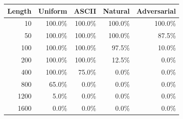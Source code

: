 \begin{tabular}{rrrrr}
\toprule
\textbf{Length} & \textbf{Uniform} & \textbf{ASCII} & \textbf{Natural} & \textbf{Adversarial} \\
\midrule
10 & 100.0\% & 100.0\% & 100.0\% & 100.0\% \\
50 & 100.0\% & 100.0\% & 100.0\% & 87.5\% \\
100 & 100.0\% & 100.0\% & 97.5\% & 10.0\% \\
200 & 100.0\% & 100.0\% & 12.5\% & 0.0\% \\
400 & 100.0\% & 75.0\% & 0.0\% & 0.0\% \\
800 & 65.0\% & 0.0\% & 0.0\% & 0.0\% \\
1200 & 5.0\% & 0.0\% & 0.0\% & 0.0\% \\
1600 & 0.0\% & 0.0\% & 0.0\% & 0.0\% \\
\bottomrule
\end{tabular}

